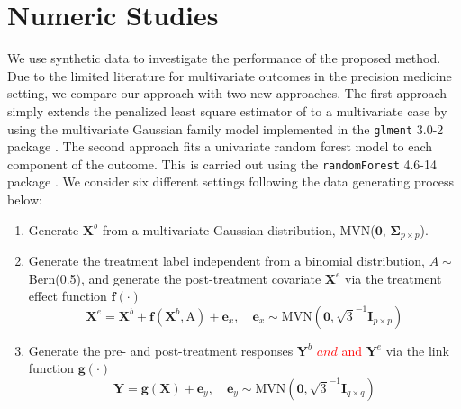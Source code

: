 \documentclass[smallextended]{svjour3}
\newcommand{\bg}[1]{\textcolor{red}{#1}}
\begin{document}
\section{Numeric Studies}\label{Sim}

We use synthetic data to investigate the performance of the proposed method. Due to the limited literature for multivariate outcomes in the precision medicine setting, we compare our approach with two new approaches. The first approach simply extends the penalized least square estimator of \citep{qian2011performance} to a multivariate case by using the multivariate Gaussian family model implemented in the \texttt{glment} 3.0-2 package \citep{glmnet}. The second approach fits a univariate random forest model to each component of the outcome. This is carried out using the \texttt{randomForest} 4.6-14 package \citep{liaw2002classification}. We consider six different settings following the data generating process below:
\begin{enumerate}
    \item Generate $\bm{X}^b$ from a multivariate Gaussian distribution, MVN($\bm 0$, $\bm \Sigma_{p \times p}$).
    \item Generate the treatment label independent from a binomial distribution, $A \sim$ Bern(0.5), and generate the post-treatment covariate $\bm X^e$ via the treatment effect function $\bm f(\cdot)$
    \[
        \bm{X}^e = \bm{X}^b + \bm f(\textbf{X}^b, \text{A}) + \textbf{e}_x, \quad \textbf{e}_x \sim \text{MVN}(\bm 0, \sqrt{3}^{-1} \bm I_{p \times p})
    \]
    \item Generate the pre- and post-treatment responses $\bm{Y}^b$ \bg{\st{$and$} and} $\bm{Y}^e$ via the link function $\bm g(\cdot)$
    \[
        \bm{Y} = \bm g(\bm{X}) + \textbf{e}_y, \quad \textbf{e}_y \sim \text{MVN}(\bm 0, \sqrt{3}^{-1} \bm I_{q \times q})
    \]
\end{enumerate}
\end{document}
